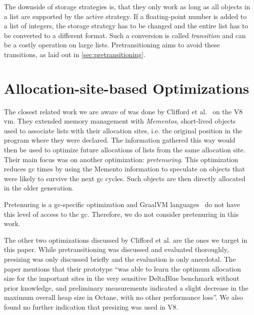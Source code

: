 \documentclass[sigconf, review, balance=false]{acmart}
\newcommand{\ac}[1]{\gls*{#1}}
\begin{document}
The downside of storage strategies is, that they only work as long as
all objects in a list are supported by the active strategy. If a
floating-point number is added to a list of integers, the storage
strategy has to be changed and the entire list has to be converted to
a different format. Such a conversion is called \emph{transition} and
can be a costly operation on large lists. Pretransitioning aims to
avoid these transitions, as laid out in
\autoref{sec:pretransitioning}.


\section{Allocation-site-based Optimizations}
\label{sec:related_work}
The closest related work we are aware of was done by Clifford et
al.~\cite{clifford2015memento} on the V8 \ac{vm}. They extended memory
management with \emph{Mementos}, short-lived objects used to associate
lists with their allocation sites, i.e. the original position in the
program where they were declared. The information gathered this way
would then be used to optimize future allocations of lists from the
same allocation site. Their main focus was on another optimization:
\emph{pretenuring}. This optimization reduces \ac{gc} times by using
the Memento information to speculate on objects that were likely to
survive the next \ac{gc} cycles. Such objects are then directly
allocated in the older generation.

Pretenuring is a \ac{gc}-specific optimization and GraalVM
languages~\cite{wurthinger2013one} do not have this level of access to
the \ac{gc}. Therefore, we do not consider pretenuring in this work.

The other two optimizations discussed by Clifford et al. are the ones
we target in this paper. While pretransitioning was discussed and
evaluated thoroughly, presizing was only discussed briefly and the
evaluation is only anecdotal. The paper mentions that their prototype
``was able to learn the optimum allocation size for the important
sites in the very sensitive DeltaBlue benchmark without prior
knowledge, and preliminary measurements indicated a slight decrease in
the maximum overall heap size in Octane, with no other performance
loss''\cite{clifford2015memento}. We also found no further indication
that presizing was used in V8.
 
\end{document}
